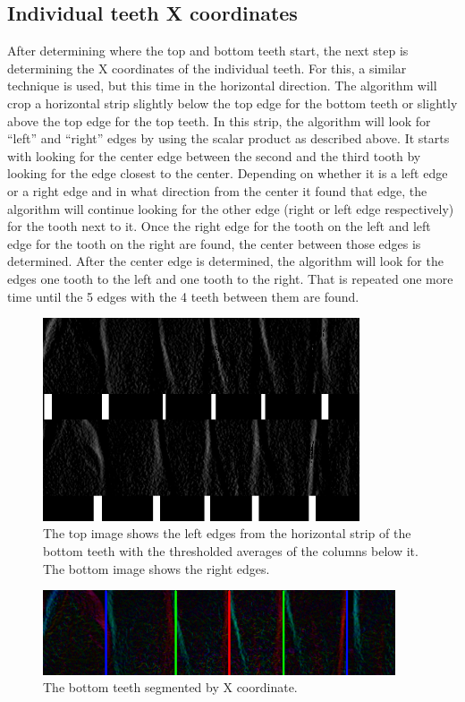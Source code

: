 \documentclass[a4paper,10pt]{article}
\begin{document}
\subsection{Individual teeth X coordinates}
After determining where the top and bottom teeth start, the next step is determining the X coordinates of the individual teeth. For this, a similar technique is used, but this time in the horizontal direction. The algorithm will crop a horizontal strip slightly below the top edge for the bottom teeth or slightly above the top edge for the top teeth. In this strip, the algorithm will look for ``left'' and ``right'' edges  by using the scalar product as described above. It starts with looking for the center edge between the second and the third tooth by looking for the edge closest to the center. Depending on whether it is a left edge or a right edge and in what direction from the center it found that edge, the algorithm will continue looking for the other edge (right or left edge respectively) for the tooth next to it. Once the right edge for the tooth on the left and left edge for the tooth on the right are found, the center between those edges is determined. After the center edge is determined, the algorithm will look for the edges one tooth to the left and one tooth to the right. That is repeated one more time until the 5 edges with the 4 teeth between them are found.

\begin{figure}[]
\centering
\includegraphics[height=60mm]{teeth_horizontal_1.png}
 \caption{The top image shows the left edges from the horizontal strip of the bottom teeth with the thresholded averages of the columns below it. The bottom image shows the right edges.}
\end{figure}
 


\begin{figure}[]
\centering
\includegraphics[height=25mm]{teeth_horizontal_2.png}
 \caption{The bottom teeth segmented by X coordinate.}
\end{figure}
\end{document}
